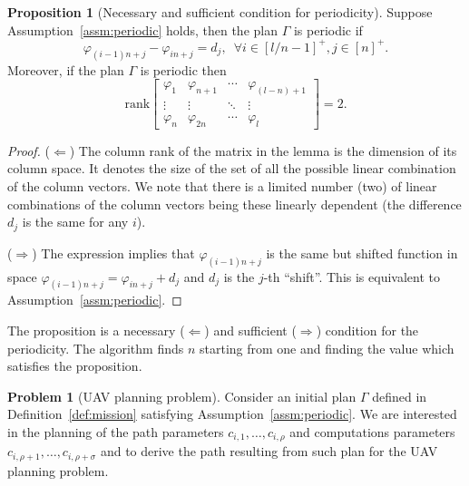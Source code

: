 \documentclass[letterpaper,10pt,conference]{ieeeconf}
\theoremstyle{definition}
\newtheorem{prop}[thm]{Proposition}
\newtheorem{pb}{Problem}[section]
\begin{document}
\begin{prop}[Necessary and sufficient condition for periodicity]\label{prop:rank}
  Suppose Assumption~\ref{assm:periodic} holds, then the plan $\Gamma$ is periodic if
  \begin{equation*}
    \varphi_{(i-1)n+j}-\varphi_{in+j}=d_j,\,\,\,\forall i\in[l/n-1]^+,j\in[n]^+.
  \end{equation*}
  Moreover, if the plan $\Gamma$ is periodic then
  \begin{equation*}
    \mathrm{rank}\begin{bmatrix}
        \varphi_1 & \varphi_{n+1} & \cdots & \varphi_{(l-n)+1} \\ 
        \vdots & \vdots & \ddots & \vdots \\
        \varphi_n & \varphi_{2n} & \cdots & \varphi_l   
      \end{bmatrix}=2.
  \end{equation*}
\end{prop}
\begin{proof}($\Longleftarrow$) The column rank of the matrix in the lemma is the dimension of its column space. It denotes the size of the set of all the possible linear combination of the column vectors. We note that there is a limited number (two) of linear combinations of the column vectors being these linearly dependent (the difference $d_j$ is the same for any $i$). 

  ($\Longrightarrow$) The expression implies that $\varphi_{(i-1)n+j}$ is the same but shifted function in space $\varphi_{(i-1)n+j}=\varphi_{in+j}+d_j$ and $d_j$ is the $j$-th ``shift''. This is equivalent to Assumption~\ref{assm:periodic}.
\end{proof}

The proposition is a necessary ($\Longleftarrow$) and sufficient ($\Longrightarrow$) condition for the periodicity. The algorithm finds $n$ starting from one and finding the value which satisfies the proposition. 

\begin{pb}[UAV planning problem]\label{pb}
  Consider an initial plan $\Gamma$ defined in Definition~\ref{def:mission} satisfying Assumption~\ref{assm:periodic}. We are interested in the planning of the path parameters $c_{i,1},\dots,c_{i,\rho}$ and computations parameters $c_{i,\rho+1},\dots,c_{i,\rho+\sigma}$ and to derive the path resulting from such plan for the UAV planning problem.
\end{pb}
\end{document}

